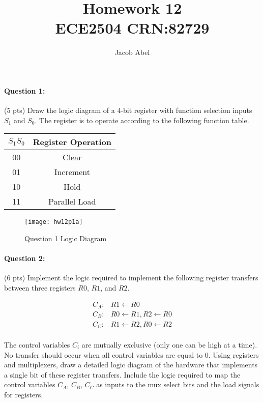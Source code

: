 \documentclass[12pt,letterpaper,titlepage]{report}
\author{Jacob Abel}
\title{%
	Homework 12
	\\\large ECE2504 CRN:82729
}
\begin{document}
\maketitle
\begin{raggedright}
\raggedcolumns

\paragraph{Question 1:}
(5 pts) Draw the logic diagram of a 4‐bit register with function selection inputs $S_1$ and $S_0$. The register is to operate according to the following function table.

\begin{center}
\def\arraystretch{1.5} 
\begin{tabular}{|c|c|}\hline 
$S_1S_0$ & Register Operation \\ \hline 
00 & Clear \\ \hline 
01 & Increment \\ \hline 
10 & Hold \\ \hline 
11 & Parallel Load \\ \hline 
\end{tabular} 
\end{center}

\begin{figure}[ht]
  \centering
  \texttt{[image: hw12p1a]}
  \caption{Question 1 Logic Diagram}
\end{figure}

\clearpage

\paragraph{Question 2:}
(6 pts) Implement the logic required to implement the following register transfers between three registers $R0$, $R1$, and $R2$.

\begin{align*}
C_A:& R1 \gets R0\\
C_B:& R0 \gets R1, R2 \gets R0\\
C_C:& R1 \gets R2, R0 \gets R2\\
\end{align*}

The control variables $C_i$ are mutually exclusive (only one can be high at a time). No transfer should occur when all control variables are equal to 0. Using registers and multiplexers, draw a detailed logic diagram of the hardware that implements a single bit of these register transfers. Include the logic required to map the control variables $C_A$, $C_B$, $C_C$ as inputs to the mux select bits and the load signals for registers.


\end{raggedright}
\end{document}
